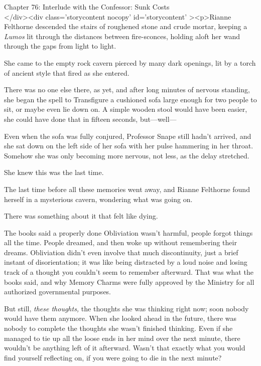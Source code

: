 
Chapter 76: Interlude with the Confessor: Sunk Costs\\
</div><div  class='storycontent nocopy' id='storycontent' ><p>Rianne Felthorne 
descended the stairs of roughened stone and crude mortar, keeping a 
\emph{Lumos} lit through the distances between fire-sconces, holding aloft her 
wand through the gaps from light to light.

She came to the empty rock cavern pierced by many dark openings, lit by a torch 
of ancient style that fired as she entered.

There was no one else there, as yet, and after long minutes of nervous 
standing, she began the spell to Transfigure a cushioned sofa large enough for 
two people to sit, or maybe even lie down on. A simple wooden stool would have 
been easier, she could have done that in fifteen seconds, but---well---

Even when the sofa was fully conjured, Professor Snape still hadn't arrived, 
and she sat down on the left side of her sofa with her pulse hammering in her 
throat. Somehow she was only becoming more nervous, not less, as the delay 
stretched.

She knew this was the last time.

The last time before all these memories went away, and Rianne Felthorne found 
herself in a mysterious cavern, wondering what was going on.

There was something about it that felt like dying.

The books said a properly done Obliviation wasn't harmful, people forgot things 
all the time. People dreamed, and then woke up without remembering their 
dreams. Obliviation didn't even involve that much discontinuity, just a brief 
instant of disorientation; it was like being distracted by a loud noise and 
losing track of a thought you couldn't seem to remember afterward. That was 
what the books said, and why Memory Charms were fully approved by the Ministry 
for all authorized governmental purposes.

But still, \emph{these thoughts,} the thoughts she was thinking right now; soon 
nobody would have them anymore. When she looked ahead in the future, there was 
nobody to complete the thoughts she wasn't finished thinking. Even if she 
managed to tie up all the loose ends in her mind over the next minute, there 
wouldn't be anything left of it afterward. Wasn't that exactly what you would 
find yourself reflecting on, if you were going to die in the next minute?

